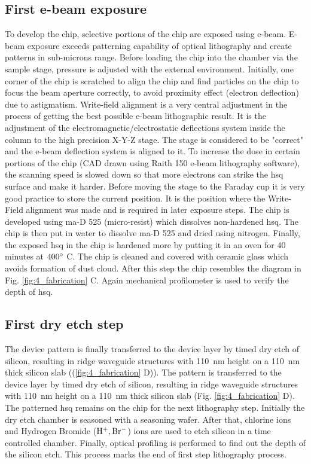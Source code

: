 \documentclass[../report.tex]{subfiles}
\begin{document}
\subsection{First e-beam exposure}
To develop the chip, selective portions of the chip are exposed using e-beam. E-beam exposure exceeds patterning capability of optical lithography and create patterns in sub-microns range. Before loading the chip into the chamber via the sample stage, pressure is adjusted with the external environment. Initially, one corner of the chip is scratched to align the chip and find particles on the chip to focus the beam aperture correctly, to avoid proximity effect (electron deflection) due to astigmatism. Write-field alignment is a very central adjustment in the process of getting the best possible e-beam lithographic result. It is the adjustment of the electromagnetic/electrostatic deflections system inside the column to the high precision X-Y-Z stage. The stage is considered to be "correct" and the e-beam deflection system is aligned to it. To increase the dose in certain portions of the chip (CAD drawn using Raith 150 e-beam lithography software), the scanning speed is slowed down so that more electrons can strike the \gls{hsq} surface and make it harder. Before moving the stage to the Faraday cup it is very good practice to store the current position. It is the position where the Write-Field alignment was made and is required in later exposure steps. The chip is developed using ma-D 525 (micro-resist) which dissolves non-hardened \gls{hsq}. The chip is then put in water to dissolve ma-D 525 and dried using nitrogen. Finally, the exposed \gls{hsq} in the chip is hardened more by putting it in an oven for 40 minutes at $\mathrm{400^{\circ}}$ C. The chip is cleaned and covered with ceramic glass which avoids formation of dust cloud. After this step the chip resembles the diagram in Fig. \ref{fig:4_fabrication} C. Again mechanical profilometer is used to verify the depth of \gls{hsq}.    

\subsection{First dry etch step}
The device pattern is finally transferred to the device layer by timed dry etch of silicon, resulting in ridge waveguide structures with \SI{110}{\nano \meter} height on a \SI{110}{\nano \meter} thick silicon slab ((\ref{fig:4_fabrication} D)). The pattern is transferred to the device layer by timed dry etch of silicon, resulting in ridge waveguide structures with \SI{110}{\nano \meter} height on a \SI{110}{\nano \meter} thick silicon slab (Fig. \ref{fig:4_fabrication} D). The patterned \gls{hsq} remains on the chip for the next lithography step. Initially the dry etch chamber is seasoned with a seasoning wafer. After that, chlorine ions and Hydrogen Bromide ($\mathrm{H^{+}, Br^{-}}$) ions are used to etch silicon in a time controlled chamber. Finally, optical profiling is performed to find out the depth of the silicon etch. This process marks the end of first step lithography process.
\end{document}
